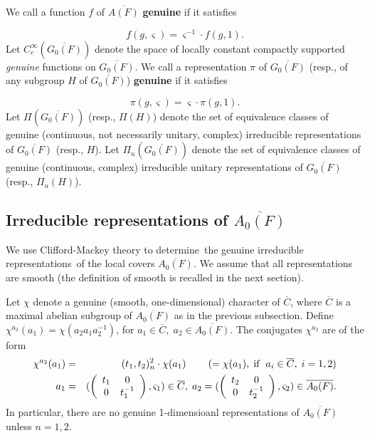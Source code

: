 We call a function $f$ of $\overline{A(F)}$ {\bf genuine} if it satisfies

\begin{equation}
f(g,\varsigma )=\varsigma ^{-1}\cdot f(g,1).
\end{equation}
Let $C_c^\infty (\overline{G_0(F)})$ denote the space of locally constant
compactly supported {\em genuine} functions on $\overline{G_0(F)}$. We call
a representation $\pi $ of $\overline{G_0(F)}$ (resp., of any subgroup $H$
of $\overline{G_0(F)}$) {\bf genuine} if it satisfies

\begin{equation}
\pi (g,\varsigma )=\varsigma \cdot \pi (g,1).
\end{equation}
Let $\Pi (\overline{G_0(F)})$ (resp., $\Pi (H)$) denote the set of
equivalence classes of genuine (continuous, not necessarily unitary,
complex) irreducible representations of $\overline{G_0(F)}$ (resp., $H$).
Let $\Pi _u(\overline{G_0(F)})$ denote the set of equivalence classes of
genuine (continuous, complex) irreducible unitary representations of
$\overline{G_0(F)}$ (resp., $\Pi _u(H)$).

\subsection{Irreducible representations of $\overline{A_0(F)}$}

We use Clifford-Mackey theory to determine\ the genuine irreducible
representations\ of the local covers $\overline{A_0(F)}$. We assume that all
representations are smooth (the definition of smooth is recalled in the next
section).

Let $\chi $ denote a genuine (smooth, one-dimensional) character of
$\overline{C}$, where $\overline{C}$ is a maximal abelian subgroup of
$\overline{A_0(F)}$ as in the previous subsection. Define $\chi
^{a_2}(a_1)=\chi (a_2a_1a_2^{-1})$, for $a_1\in \overline{C},\;a_2\in 
\overline{A_0(F)}$. The conjugates $\chi ^{a_2}$ are of the form 
\begin{eqnarray}
\chi ^{a_2}(a_1) &=&(t_1,t_2)_n^2\cdot \chi (a_1)\;\;\;\;\;\;\;\;(=\chi
(a_1),\;{\rm if\;}\;a_i\in \overline{C},\;i=1,2)  \nonumber \\
a_1 &=&(\left( 
\begin{array}{cc}
t_1 & 0 \\ 
0 & t_1^{-1}
\end{array}
\right) ,\varsigma _1)\in \overline{C},\;a_2=(\left( 
\begin{array}{cc}
t_2 & 0 \\ 
0 & t_2^{-1}
\end{array}
\right) ,\varsigma _2)\in \overline{A_0(F)}.
\end{eqnarray}
In particular, there are no genuine 1-dimensioanl representations of $%
\overline{A_0(F)}$ unless $n=1,2$.

